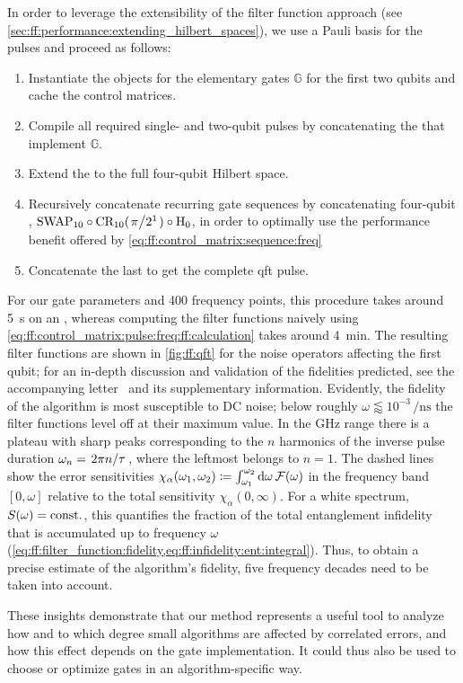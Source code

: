 In order to leverage the extensibility of the filter function approach (see \cref{sec:ff:performance:extending_hilbert_spaces}), we use a Pauli basis for the pulses and proceed as follows:
\begin{enumerate}
    \item Instantiate the \pulsesequence objects for the elementary gates $\mathbb{G}$ for the first two qubits and cache the control matrices.
    \item Compile all required single- and two-qubit pulses by concatenating the \pulsesequences that implement $\mathbb{G}$.
    \item Extend the \pulsesequences to the full four-qubit Hilbert space.
    \item Recursively concatenate recurring gate sequences by concatenating four-qubit \pulsesequences, \eg $\mr{SWAP}_{10}\circ\mr{CR_{10}}(\flatfrac{\pi}{2^1})\circ\mr{H}_0$, in order to optimally use the performance benefit offered by \cref{eq:ff:control_matrix:sequence:freq}
    \item Concatenate the last \pulsesequences to get the complete \gls{qft} pulse.
\end{enumerate}
For our gate parameters and \num{400} frequency points, this procedure takes around \qty{5}{\second} on an \fastprocessor, whereas computing the filter functions naively using \cref{eq:ff:control_matrix:pulse:freq:ff:calculation} takes around \qty{4}{\minute}.
The resulting filter functions are shown in \cref{fig:ff:qft} for the noise operators affecting the first qubit; for an in-depth discussion and validation of the fidelities predicted, see the accompanying letter~ and its supplementary information.
Evidently, the fidelity of the algorithm is most susceptible to DC noise; below roughly $\omega\lessapprox 10^{-3}\,\unit{\per\nano\second}$ the filter functions level off at their maximum value.
In the \unit{\giga\hertz} range there is a plateau with sharp peaks corresponding to the $n$ harmonics of the inverse pulse duration $\omega_n = \flatfrac{2\pi n}{\tau}$, where the leftmost belongs to $n=1$.
The dashed lines show the error sensitivities $\chi_\alpha(\omega_1, \omega_2)\coloneqq\int_{\omega_1}^{\omega_2}\dd{\omega}\mathcal{F}(\omega)$ in the frequency band $[0, \omega]$ relative to the total sensitivity $\chi_\alpha(0,\infty)$.
For a white spectrum, \ie $S(\omega)=\mathrm{const.}$, this quantifies the fraction of the total entanglement infidelity that is accumulated up to frequency $\omega$ (\cf \cref{eq:ff:filter_function:fidelity,eq:ff:infidelity:ent:integral}).
Thus, to obtain a precise estimate of the algorithm's fidelity, five frequency decades need to be taken into account.

These insights demonstrate that our method represents a useful tool to analyze how and to which degree small algorithms are affected by correlated errors, and how this effect depends on the gate implementation.
It could thus also be used to choose or optimize gates in an algorithm-specific way.

